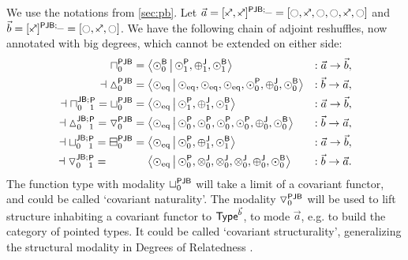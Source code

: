 \documentclass[a4paper]{memoir}
\begin{document}
\begin{example} \label{ex:pjb-paramty} 
	We use the notations from \cref{sec:pb}.
	Let $\vec a = \maskopypolar{[\ypolar, \ypolar]}{\maskpjb} = [\npolar, \ypolar, \npolar, \npolar, \ypolar, \npolar]$ and $\vec b = \maskopypolar{[\ypolar]}{\maskpjb} = [\npolar, \ypolar, \npolar]$.
	We have the following chain of adjoint reshuffles, now annotated with big degrees, which cannot be extended on either side:
	\begin{align*}
		\cohpi_0^{\maskopfont{PJB}} &= \reshlist{\nwbridgepol_0}{\nwpathpol_1, \nwpospol_1, \nwbridgepol_1} &: \vec a \to \vec b, \\
		\dashv
		\cohdisc_0^{\maskopfont{PJB}} &= \reshlist{\nonpol_\eqtydeg}{\nonpol_\eqtydeg, \nonpol_\eqtydeg, \nonpol_\eqtydeg, \nwpathpol_0, \nwpospol_0, \nwbridgepol_0} &: \vec b \to \vec a, \\
		\dashv
		\cohpi{}_0^{\maskopfont{JB};}{}_1^{\maskopfont{P}} =
		\cohfget_0^{\maskopfont{PJB}} &= \reshlist{\nonpol_\eqtydeg}{\nwpathpol_1, \nwpospol_1, \nwbridgepol_1} &: \vec a \to \vec b, \\
		\dashv
		\cohdisc{}_0^{\maskopfont{JB};}{}_1^{\maskopfont{P}} =
		\cohcodisc_0^{\maskopfont{PJB}} &= \reshlist{\nonpol_\eqtydeg}{\nwpathpol_0, \nwpathpol_0, \nwpathpol_0, \nwpathpol_0, \nwpospol_0, \nwbridgepol_0} &: \vec b \to \vec a, \\
		\dashv
		\cohfget{}_0^{\maskopfont{JB};}{}_1^{\maskopfont{P}} =
		\cohcopi_0^{\maskopfont{PJB}} &= 
		\reshlist{\nonpol_\eqtydeg}{\nwpathpol_0, \nwpospol_1, \nwbridgepol_1} &: \vec a \to \vec b, \\
		\dashv
		\cohcodisc{}_0^{\maskopfont{JB};}{}_1^{\maskopfont{P}} =
		\phantom{\cohcopi_0^{\maskopfont{PJB}}} &\mathrel{\phantom{=}} 
		\reshlist{\nonpol_\eqtydeg}{\nwpathpol_0, \nwmixpol_0, \nwmixpol_0, \nwmixpol_0, \nwpospol_0, \nwbridgepol_0} &: \vec b \to \vec a.
	\end{align*}
	The function type with modality ${\sqcup}_0^{\mathsf{PJB}}$ will take a limit of a covariant functor, and could be called `covariant naturality'.
	The modality ${\triangledown}_0^{\mathsf{PJB}}$ will be used to lift structure inhabiting a covariant functor to ${\mathsf{Type}}^{\vec b}$, to mode $\vec a$, e.g. to build the category of pointed types. It could be called `covariant structurality', generalizing the structural modality in Degrees of Relatedness \cite{reldtt}.
\end{example}
\end{document}
